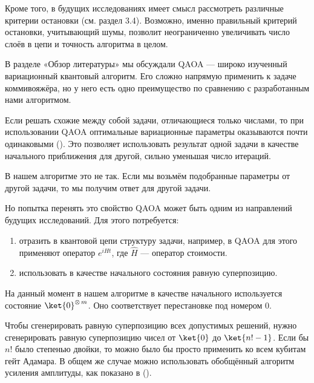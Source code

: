 Кроме того, в будущих исследованиях имеет смысл рассмотреть различные критерии остановки (см. раздел 3.4). 
Возможно, именно правильный критерий остановки, учитывающий шумы, позволит неограниченно увеличивать число слоёв в цепи и точность алгоритма в целом.




В разделе «Обзор литературы» мы обсуждали QAOA --- широко изученный вариационный квантовый алгоритм. Его сложно напрямую применить к задаче коммивояжёра, но у него есть одно преимущество по сравнению с разработанным нами алгоритмом. 

Если решать схожие между собой задачи, отличающиеся только числами, то при использовании QAOA оптимальные вариационные параметры оказываются почти одинаковыми \cite{Params} (\citeyear{Params}). Это позволяет использовать результат одной задачи в качестве начального приближения для другой, сильно уменьшая число итераций.

В нашем алгоритме это не так. Если мы возьмём подобранные параметры от другой задачи, то мы получим ответ для другой задачи.

Но попытка перенять это свойство QAOA может быть одним из направлений будущих исследований. Для этого потребуется:

\begin{enumerate}
    \item отразить в квантовой цепи структуру задачи, например, в QAOA для этого применяют оператор $e^{i \hat H t}$, где $\hat H$ --- оператор стоимости.
    
    \item использовать в качестве начального состояния равную суперпозицию.
\end{enumerate}

На данный момент в нашем алгоритме в качестве начального используется состояние $\ket{0}^{\otimes\, m}$. Оно соответствует перестановке под номером 0. 

Чтобы сгенерировать равную суперпозицию всех допустимых решений, нужно сгенерировать равную суперпозицию чисел от $\ket{0}$ до $\ket{n!-1}$. Если бы $n!$ было степенью двойки, то можно было бы просто применить ко всем кубитам гейт Адамара. В общем же случае можно использовать обобщённый алгоритм усиления амплитуды, как показано в \cite{perms} (\citeyear{perms}). 

